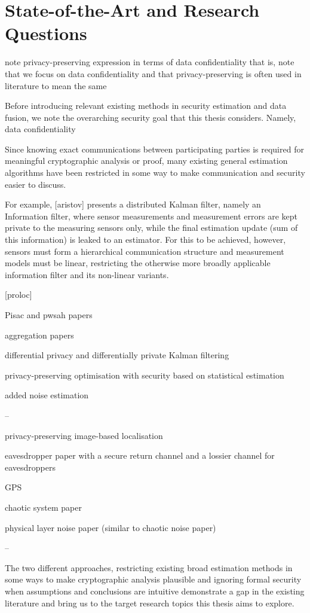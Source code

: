 \section{State-of-the-Art and Research Questions}

note privacy-preserving expression in terms of data confidentiality
that is, note that we focus on data confidentiality and that privacy-preserving is often used in literature to mean the same

Before introducing relevant existing methods in security estimation and data fusion, we note the overarching security goal that this thesis considers. Namely, data confidentiality



Since knowing exact communications between participating parties is required for meaningful cryptographic analysis or proof, many existing general estimation algorithms have been restricted in some way to make communication and security easier to discuss.


For example, [aristov] presents a distributed Kalman filter, namely an Information filter, where sensor measurements and measurement errors are kept private to the measuring sensors only, while the final estimation update (sum of this information) is leaked to an estimator. For this to be achieved, however, sensors must form a hierarchical communication structure and measurement models must be linear, restricting the otherwise more broadly applicable information filter and its non-linear variants.

[proloc]

Pisac and pwsah papers

aggregation papers

differential privacy and differentially private Kalman filtering

privacy-preserving optimisation with security based on statistical estimation

added noise estimation

--

privacy-preserving image-based localisation

eavesdropper paper with a secure return channel and a lossier channel for eavesdroppers

GPS

chaotic system paper

physical layer noise paper (similar to chaotic noise paper)

--


The two different approaches, restricting existing broad estimation methods in some ways to make cryptographic analysis plausible and ignoring formal security when assumptions and conclusions are intuitive demonstrate a gap in the existing literature and bring us to the target research topics this thesis aims to explore.

